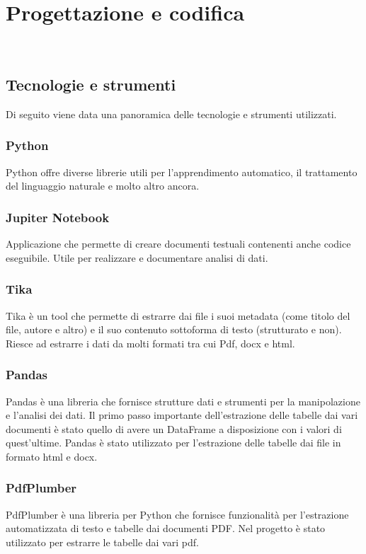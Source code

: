 \chapter{Progettazione e codifica}
\label{cap:progettazione-codifica}

\\

\section{Tecnologie e strumenti}
\label{sec:tecnologie-strumenti}

Di seguito viene data una panoramica delle tecnologie e strumenti utilizzati.
\subsection{Python}
Python offre diverse librerie utili per l'apprendimento automatico, il trattamento del linguaggio naturale e molto altro ancora.
\subsection{Jupiter Notebook}
Applicazione che permette di creare documenti testuali contenenti anche codice eseguibile. Utile per realizzare e documentare analisi di dati.
\subsection{Tika}
\label{subsec:tika}
Tika è un tool che permette di estrarre dai file i suoi metadata (come titolo del file, autore e altro) e il suo contenuto sottoforma di testo (strutturato e non).
Riesce ad estrarre i dati da molti formati tra cui Pdf, docx e html.
\subsection{Pandas}
\label{subsec:pandas}
Pandas è una libreria che fornisce strutture dati e strumenti per la manipolazione e l'analisi dei dati.
Il primo passo importante dell'estrazione delle tabelle dai vari documenti è stato quello di avere un DataFrame a disposizione con i valori di quest'ultime. 
Pandas è stato utilizzato per l'estrazione delle tabelle dai file in formato html e docx.
\subsection{PdfPlumber}
\label{subsec:pdfplumber}
PdfPlumber è una libreria per Python che fornisce funzionalità per l'estrazione automatizzata di testo e tabelle dai documenti PDF.
Nel progetto è stato utilizzato per estrarre le tabelle dai vari pdf.
